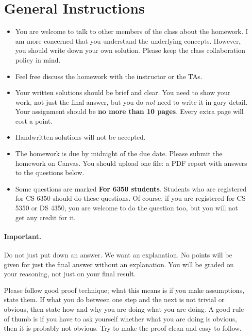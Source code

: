 \section*{General Instructions}

{\footnotesize
  \begin{itemize}
  \item You are welcome to talk to other members of the class about
    the homework. I am more concerned that you understand the
    underlying concepts. However, you should write down your own
    solution. Please keep the class collaboration policy in mind.

  \item Feel free discuss the homework with the instructor or the TAs.

  \item Your written solutions should be brief and clear. You need to
    show your work, not just the final answer, but you do \emph{not}
    need to write it in gory detail. Your assignment should be {\bf no
      more than 10 pages}. Every extra page will cost a point.

  \item Handwritten solutions will not be accepted.

  \item The homework is due by midnight of the due date. Please submit
    the homework on Canvas. You should upload one file: a PDF report with answers to the questions below.

  \item Some questions are marked {\bf For 6350 students}. Students who are
    registered for CS 6350 should do these questions. Of course, if you are
    registered for CS 5350 or DS 4350, you are welcome to do the question too,
    but you will not get any credit for it.

  \end{itemize}

 \paragraph{Important.} Do not just put down an answer. We want an
  explanation. No points will be given for just the final answer
  without an
  explanation. You will be graded on your reasoning, not just
   on your final result.

   Please follow good proof technique; what this means is if you make
   assumptions, state them. If what you do between one step and the
   next is not trivial or obvious, then state how and why you are
   doing what you are doing. A good rule of thumb is if you have to
   ask yourself whether what you are doing is obvious, then it is
   probably not obvious. Try to make the proof clean and easy to
   follow. 
}
